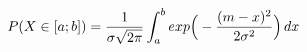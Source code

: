 \documentclass[preview]{standalone}
\begin{document}
\begin{align*}
P( X \in [a;b] ) = { \frac{1}{\sigma \sqrt{2\pi}} } \int_a^b { exp\Big(-{ {(m - x)^2} \over {2 \sigma^2} }\Big) } \, dx
\end{align*}
\end{document}
